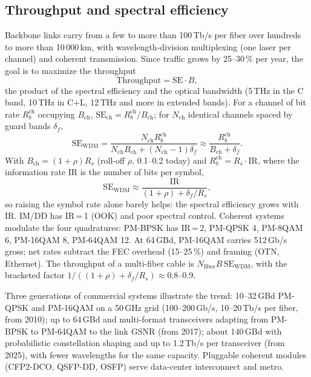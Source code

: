 \subsection{Throughput and spectral efficiency}
Backbone links carry from a few to more than 100\,Tb/s per fiber over hundreds to more than
10\,000\,km, with wavelength-division multiplexing (one laser per channel) and coherent
transmission. Since traffic grows by 25--30\,\% per year, the goal is to maximize the throughput
\begin{equation}
  \text{Throughput}=\mathrm{SE}\cdot B,
\end{equation}
the product of the spectral efficiency and the optical bandwidth (5\,THz in the C band, 10\,THz in
C+L, 12\,THz and more in extended bands). For a channel of bit rate $R_b^{\mathrm{ch}}$ occupying
$B_{\mathrm{ch}}$, $\mathrm{SE}_{\mathrm{ch}}=R_b^{\mathrm{ch}}/B_{\mathrm{ch}}$; for $N_{\mathrm{ch}}$ identical channels spaced by guard bands $\delta_f$,
\begin{equation}
  \mathrm{SE}_{\mathrm{WDM}}=\frac{N_{\mathrm{ch}}R_b^{\mathrm{ch}}}{N_{\mathrm{ch}}B_{\mathrm{ch}}+(N_{\mathrm{ch}}-1)\delta_f}\approx\frac{R_b^{\mathrm{ch}}}{B_{\mathrm{ch}}+\delta_f}.
\end{equation}
With $B_{\mathrm{ch}}=(1+\rho)R_s$ (roll-off $\rho$, 0.1--0.2 today) and $R_b^{\mathrm{ch}}=R_s\cdot\mathrm{IR}$, where the information
rate IR is the number of bits per symbol,
\begin{equation}
  \mathrm{SE}_{\mathrm{WDM}}\approx\frac{\mathrm{IR}}{(1+\rho)+\delta_f/R_s},
\end{equation}
so raising the symbol rate alone barely helps: the spectral efficiency grows with IR. IM/DD has
IR\,=\,1 (OOK) and poor spectral control. Coherent systems modulate the four quadratures: PM-BPSK has
IR\,=\,2, PM-QPSK 4, PM-8QAM 6, PM-16QAM 8, PM-64QAM 12. At 64\,GBd, PM-16QAM carries 512\,Gb/s gross; net
rates subtract the FEC overhead (15--25\,\%) and framing (OTN, Ethernet). The throughput of a
multi-fiber cable is $N_{\mathrm{fiber}}B\,\mathrm{SE}_{\mathrm{WDM}}$, with the bracketed factor $1/((1+\rho)+\delta_f/R_s)\approx0.8$--0.9.

Three generations of commercial systems illustrate the trend: 10--32\,GBd PM-QPSK and PM-16QAM on a
50\,GHz grid (100--200\,Gb/s, 10--20\,Tb/s per fiber, from 2010); up to 64\,GBd and multi-format
transceivers adapting from PM-BPSK to PM-64QAM to the link GSNR (from 2017); about 140\,GBd with
probabilistic constellation shaping and up to 1.2\,Tb/s per transceiver (from 2025), with fewer
wavelengths for the same capacity. Pluggable coherent modules (CFP2-DCO, QSFP-DD, OSFP) serve
data-center interconnect and metro.

